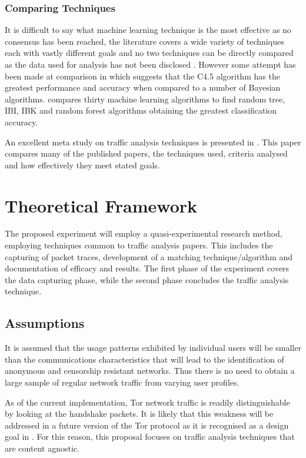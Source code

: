 \documentclass{conference}
\begin{document}
\subsubsection{Comparing Techniques}

It is difficult to say what machine learning technique is the most effective as no consensus has been reached, the literature covers a wide variety of techniques each with vastly different goals and no two techniques can be directly compared as the data used for analysis has not been disclosed \citep{Kim:2007p3867}. However some attempt has been made at comparison in \citet{Williams:2006p3849} which suggests that the C4.5 algorithm has the greatest performance and accuracy when compared to a number of Bayesian algorithms. \citet{Mohd:2009p6484} compares thirty machine learning algorithms  to find random tree, IBI, IBK and random forest algorithms obtaining the greatest classification accuracy.

An excellent meta study on traffic analysis techniques is presented in \citet{Nguyen:2008p3837}. This paper compares many of the published papers, the techniques used, criteria analysed and how effectively they meet stated goals.

\section{Theoretical Framework}

The proposed experiment will employ a quasi-experimental research method, employing techniques common to traffic analysis papers. This includes the capturing of packet traces, development of a matching technique/algorithm and documentation of efficacy and results. The first phase of the experiment covers the data capturing phase, while the second phase concludes the traffic analysis technique.

\subsection{Assumptions}

It is assumed that the usage patterns exhibited by individual users will be smaller than the communications characteristics that will lead to the identification of anonymous and censorship resistant networks. Thus there is no need to obtain a large sample of regular network traffic from varying user profiles.

As of the current implementation, Tor network traffic is readily distinguishable by looking at the handshake packets. It is likely that this weakness will be addressed in a future version of the Tor protocol as it is recognised as a design goal in \citet{Dingledine:2008p1542}. For this reason, this proposal focuses on traffic analysis techniques that are content agnostic.
\end{document}
